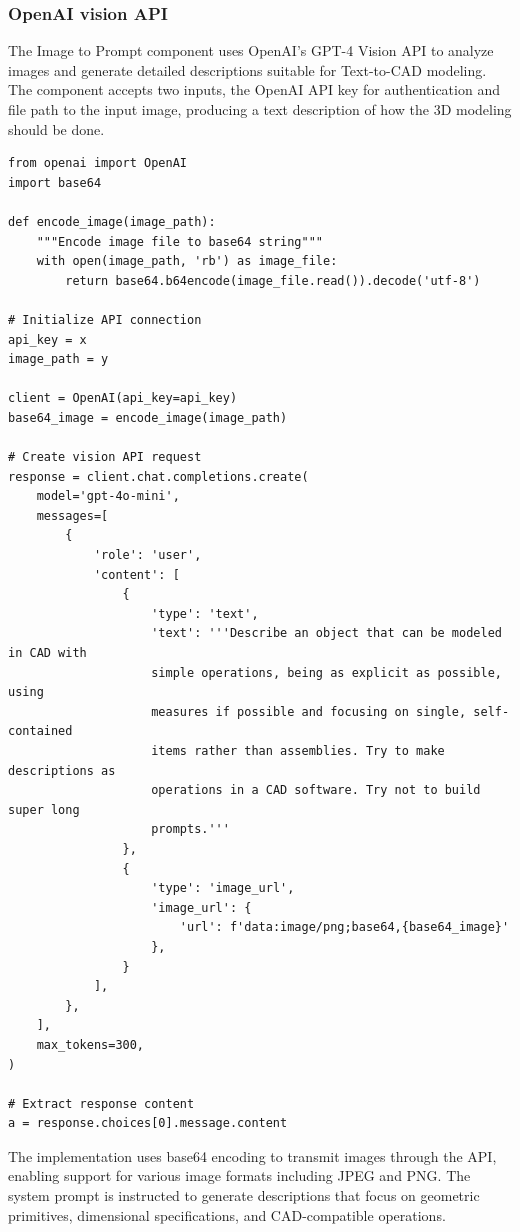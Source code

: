 \subsubsection{OpenAI vision API}

The Image to Prompt component uses OpenAI's GPT-4 Vision API to analyze images and generate detailed descriptions suitable for Text-to-CAD modeling. The component accepts two inputs, the OpenAI API key for authentication and file path to the input image, producing a text description of how the 3D modeling should be done.

\begin{verbatim}
from openai import OpenAI
import base64

def encode_image(image_path):
    """Encode image file to base64 string"""
    with open(image_path, 'rb') as image_file:
        return base64.b64encode(image_file.read()).decode('utf-8')

# Initialize API connection
api_key = x
image_path = y

client = OpenAI(api_key=api_key)
base64_image = encode_image(image_path)

# Create vision API request
response = client.chat.completions.create(
    model='gpt-4o-mini',
    messages=[
        {
            'role': 'user',
            'content': [
                {
                    'type': 'text',
                    'text': '''Describe an object that can be modeled in CAD with 
                    simple operations, being as explicit as possible, using 
                    measures if possible and focusing on single, self-contained 
                    items rather than assemblies. Try to make descriptions as 
                    operations in a CAD software. Try not to build super long 
                    prompts.'''
                },
                {
                    'type': 'image_url',
                    'image_url': {
                        'url': f'data:image/png;base64,{base64_image}'
                    },
                }
            ],
        },
    ],
    max_tokens=300,
)

# Extract response content
a = response.choices[0].message.content
\end{verbatim}

The implementation uses base64 encoding to transmit images through the API, enabling support for various image formats including JPEG and PNG. The system prompt is instructed to generate descriptions that focus on geometric primitives, dimensional specifications, and CAD-compatible operations.

